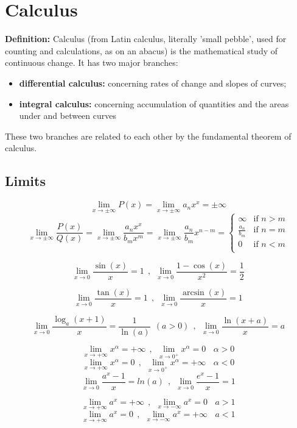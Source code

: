 \chapter{Calculus}
\textbf{Definition:} Calculus (from Latin calculus, literally 'small pebble', used for counting and calculations, as on an abacus) is the mathematical study of continuous change. It has two major branches:
\begin{itemize}  
	\item \textbf{differential calculus:} concerning rates of change and slopes of curves;
	\item \textbf{integral calculus:} concerning accumulation of quantities and the areas under and between curves
\end{itemize}
These two branches are related to each other by the fundamental theorem of calculus. 


\section{Limits}
\[
\lim_{x\rightarrow\pm\infty}P(x)=\lim_{x\rightarrow\pm\infty}a_nx^x=\pm\infty
\]
\[
\lim_{x\rightarrow\pm\infty}\frac{P(x)}{Q(x)}=\lim_{x\rightarrow\pm\infty}\frac{a_nx^x}{b_mx^m}=\lim_{x\rightarrow\pm\infty}\frac{a_n}{b_m}x^{n-m}=
\begin{cases}
	\infty & \text{if } n>m \\
	\frac{a_n}{b_m} & \text{if } n=m \\
	0 & \text{if } n<m \\
\end{cases}
\]

\[
\lim_{x\rightarrow0}\frac{\sin(x)}{x}=1 ~~,~~ \lim_{x\rightarrow0}\frac{1-\cos(x)}{x^2}=\frac{1}{2}
\]

\[
\lim_{x\rightarrow0}\frac{\tan(x)}{x}=1 ~~,~~ \lim_{x\rightarrow0}\frac{\arcsin(x)}{x}=1
\]

\[
\lim_{x\rightarrow0}\frac{\log_a(x+1)}{x}=\frac{1}{\ln(a)} ~~ (a>0) ~~,~~
\lim_{x\rightarrow0}\frac{\ln(x+a)}{x}=a
\]

\[
\lim_{x\rightarrow+\infty}x^\alpha=+\infty ~~,~~ \lim_{x\rightarrow0^+}x^\alpha=0 ~~~~ \alpha>0
\]
\[
\lim_{x\rightarrow+\infty}x^\alpha=0 ~~,~~ \lim_{x\rightarrow0^+}x^\alpha=+\infty ~~~~ \alpha<0
\]
\[
\lim_{x\rightarrow0}\frac{a^x-1}{x}=ln(a) ~~,~~ \lim_{x\rightarrow0}\frac{e^x-1}{x}=1
\]

\[
\lim_{x\rightarrow+\infty}a^x=+\infty ~~,~~ \lim_{x\rightarrow-\infty}a^x=0 ~~~~ a>1
\]
\[
\lim_{x\rightarrow+\infty}a^x=0 ~~,~~ \lim_{x\rightarrow-\infty}a^x=+\infty ~~~~ a<1
\]

